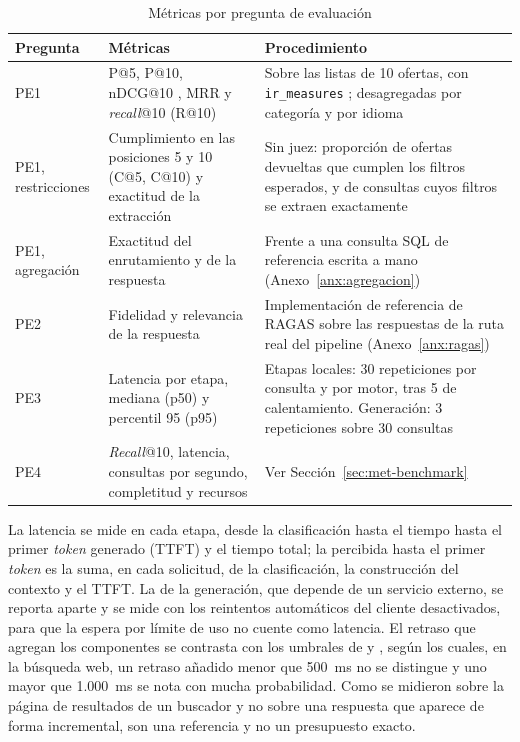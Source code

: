 \begin{table}[htbp!]
    \centering
    \caption{Métricas por pregunta de evaluación}
    \label{tab:met-metricas}
    \small
    \begin{tabular}{|p{1.9cm}|p{5.3cm}|p{6.9cm}|}
        \hline
        \textbf{Pregunta} & \textbf{Métricas} & \textbf{Procedimiento} \\
        \hline
        PE1 & P@5, P@10, nDCG@10 \citep{Jarvelin2002}, MRR y \textit{recall}@10 (R@10) & Sobre las listas de 10 ofertas, con \texttt{ir\_measures} \citep{MacAvaney2022}; desagregadas por categoría y por idioma \\
        \hline
        PE1, restricciones & Cumplimiento en las posiciones 5 y 10 (C@5, C@10) y exactitud de la extracción & Sin juez: proporción de ofertas devueltas que cumplen los filtros esperados, y de consultas cuyos filtros se extraen exactamente \\
        \hline
        PE1, agregación & Exactitud del enrutamiento y de la respuesta & Frente a una consulta SQL de referencia escrita a mano (Anexo~\ref{anx:agregacion}) \\
        \hline
        PE2 & Fidelidad y relevancia de la respuesta \citep{Es2024} & Implementación de referencia de RAGAS sobre las respuestas de la ruta real del pipeline (Anexo~\ref{anx:ragas}) \\
        \hline
        PE3 & Latencia por etapa, mediana (p50) y percentil 95 (p95) & Etapas locales: 30 repeticiones por consulta y por motor, tras 5 de calentamiento. Generación: 3 repeticiones sobre 30 consultas \\
        \hline
        PE4 & \textit{Recall}@10, latencia, consultas por segundo, completitud y recursos & Ver Sección~\ref{sec:met-benchmark} \\
        \hline
    \end{tabular}
\end{table}

La latencia se mide en cada etapa, desde la clasificación hasta el tiempo hasta el primer \textit{token} generado (TTFT) y el tiempo total; la percibida hasta el primer \textit{token} es la suma, en cada solicitud, de la clasificación, la construcción del contexto y el TTFT. La de la generación, que depende de un servicio externo, se reporta aparte y se mide con los reintentos automáticos del cliente desactivados, para que la espera por límite de uso no cuente como latencia. El retraso que agregan los componentes se contrasta con los umbrales de \citet{Arapakis2014} y \citet{Bai2017}, según los cuales, en la búsqueda web, un retraso añadido menor que 500~ms no se distingue y uno mayor que 1.000~ms se nota con mucha probabilidad. Como se midieron sobre la página de resultados de un buscador y no sobre una respuesta que aparece de forma incremental, son una referencia y no un presupuesto exacto.

